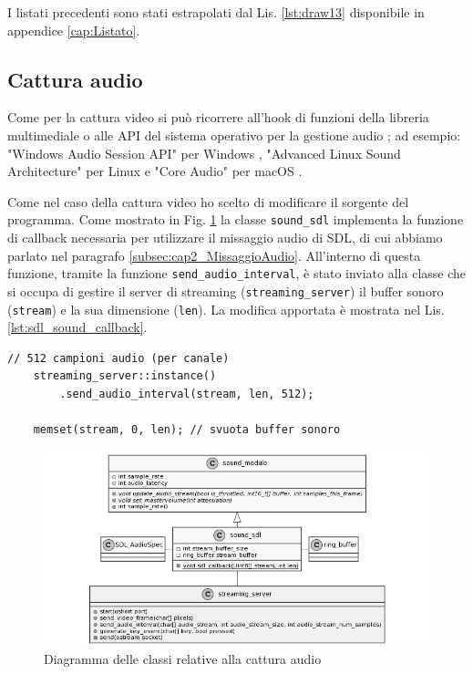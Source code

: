 I listati precedenti sono stati estrapolati dal Lis. \ref{lst:draw13} disponibile in appendice \ref{cap:Listato}.



\subsection{Cattura audio} \label{subsec:cap3_Audio}
Come per la cattura video si può ricorrere all'hook di funzioni della libreria multimediale o alle API del sistema operativo per la gestione audio \parencite{GamingAnywhere}; ad esempio: "Windows Audio Session API" per Windows \parencite{WASAPI}, "Advanced Linux Sound Architecture" per Linux \parencite{ALSA} e "Core Audio" per macOS \parencite{Core_Audio_api}.

Come nel caso della cattura video ho scelto di modificare il sorgente del programma. Come mostrato in Fig. \ref{fig:class_mixingSDL_streaming} la classe \verb|sound_sdl| implementa la funzione di callback necessaria per utilizzare il missaggio audio di SDL, di cui abbiamo parlato nel paragrafo \ref{subsec:cap2_MissaggioAudio}. All'interno di questa funzione, tramite la funzione \verb|send_audio_interval|, è stato inviato alla classe che si occupa di gestire il server di streaming (\verb|streaming_server|) il buffer sonoro (\verb|stream|) e la sua dimensione (\verb|len|). La modifica apportata è mostrata nel Lis. \ref{lst:sdl_sound_callback}.

\begin{lstlisting}[caption=Codice aggiunto per la cattura audio, label={lst:sdl_sound_callback}]
	// 512 campioni audio (per canale)
	streaming_server::instance()
		.send_audio_interval(stream, len, 512);

	memset(stream, 0, len); // svuota buffer sonoro
\end{lstlisting}


\begin{figure}[H]
	\includegraphics[width=\linewidth]{immagini/class_mixingSDL_streaming}
	\caption{Diagramma delle classi relative alla cattura audio}
	\label{fig:class_mixingSDL_streaming}
\end{figure}

